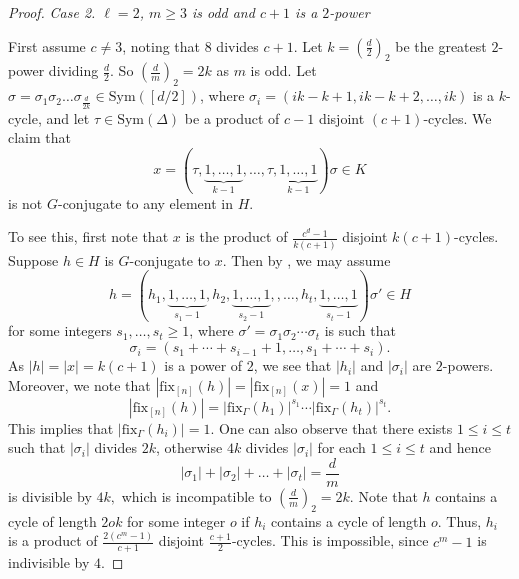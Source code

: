 \documentclass[twoside,a4paper,reqno,11pt]{amsart}
\newcommand{\<}{\langle}
\renewcommand{\>}{\rangle}
\newcommand{\leqs}{\leqslant}
\newcommand{\geqs}{\geqslant}
\newcommand{\vs}{\vspace{2mm}}
\newcommand{\fix}{\mathrm{fix}}
\def\Sym{\mathrm{Sym}}
\theoremstyle{definition}
\begin{document}
\begin{proof}
		\vs
		
		\noindent \emph{Case 2. $\ell = 2$, $m\geqs 3$ is odd and $c+1$ is a $2$-power}
		
		\vs
		
		First assume $c\neq 3$, noting that $8$ divides $c+1.$ Let $k=(\frac{d}{2})_2$ be the greatest $2$-power dividing $\frac{d}{2}$. So $(\frac{d}{m})_2 = 2k$ as $m$ is odd. Let $\sigma=\sigma_1\sigma_2\dots \sigma_{\frac{d}{2k}}\in \mathrm{Sym}([d/2])$, where $\sigma_i=(ik-k+1, ik-k+2,\dots, ik)$ is a $k$-cycle, and let $\tau\in \Sym(\Delta)$ be a product of $c-1$ disjoint $(c+1)$-cycles.  We claim that
		\begin{equation*}
		x=(\tau, \underbrace{1, \dots, 1}_{k-1}, \dots, \tau, \underbrace{1, \dots, 1}_{k-1})\sigma\in K
		\end{equation*} 
		is not $G$-conjugate to any element in $H$.
		
		To see this, first note that $x$ is the product of $\frac{c^d-1}{k(c+1)}$ disjoint $k(c+1)$-cycles. Suppose $h\in H$ is $G$-conjugate to $x$. Then by \cite[Proposition 2.1]{CH_conju}, we may assume
		\begin{equation*}
		h=(h_1, \underbrace{1, \dots, 1}_{s_1-1},h_2, \underbrace{1,\dots, 1}_{s_2-1}, ,\dots, h_t, \underbrace{1,\dots, 1}_{s_t-1})\sigma' \in H
		\end{equation*}
		for some integers $s_1,\dots,s_t\geqs 1$, where $\sigma' = \sigma_1\sigma_2\cdots\sigma_t$ is such that
		\begin{equation*}
		\sigma_i = (s_1+\cdots+s_{i-1}+1,\dots,s_1+\cdots+s_i).
		\end{equation*}
		As $|h| = |x| = k(c+1)$ is a power of $2$, we see that $|h_i|$ and $|\sigma_i|$ are $2$-powers. Moreover, we note that $|\fix_{[n]}(h)| = |\fix_{[n]}(x)| = 1$ and
		\begin{equation*}
		|\fix_{[n]}(h)| = |\fix_{\Gamma}(h_1)|^{s_1}\cdots |\fix_{\Gamma}(h_t)|^{s_t}.
		\end{equation*}
		This implies that $|\fix_\Gamma(h_i)| = 1$. 
		One can also observe that there exists $1\leqs i \leqs t$ such that $|\sigma_i|$ divides $2k$, otherwise $4k$ divides $|\sigma_i|$ for each $1\leqs i \leqs t$ and hence $$|\sigma_1|+|\sigma_2|+\dots +|\sigma_t|= \frac{d}{m}$$ is divisible by $4k,$ which is incompatible to $(\frac{d}{m})_2=2k$. 
		Note that $h$ contains a cycle of length $2ok$ for some integer $o$ if $h_i$ contains a cycle of length $o$. 
		Thus, $h_i$ is a product of $\frac{2(c^m-1)}{c+1}$ disjoint $\frac{c+1}{2}$-cycles. This is impossible, since $c^m-1$ is indivisible by $4$.
		

\end{proof}
\end{document}
